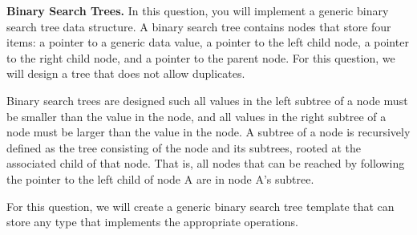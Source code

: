 \documentclass{exam}
\begin{document}
\begin{questions}

\question[30]
\textbf{Binary Search Trees.}
In this question, you will implement a generic binary search tree data structure. 
A binary search tree contains nodes that store four items: a pointer to a generic data value, a pointer to the left child node, a pointer to the right child node, and a pointer to the parent node. 
For this question, we will design a tree that does not allow duplicates. 

Binary search trees are designed such all values in the left subtree of a node must be smaller than the value in the node, and all values in the right subtree of a node must be larger than the value in the node. 
A subtree of a node is recursively defined as the tree consisting of the node and its subtrees, rooted at the associated child of that node. 
That is, all nodes that can be reached by following the pointer to the left child of node A are in node A's subtree. 

For this question, we will create a generic binary search tree template that can store any type that implements the appropriate operations. 
\begin{parts}

\end{parts}
\end{questions}
\end{document}
